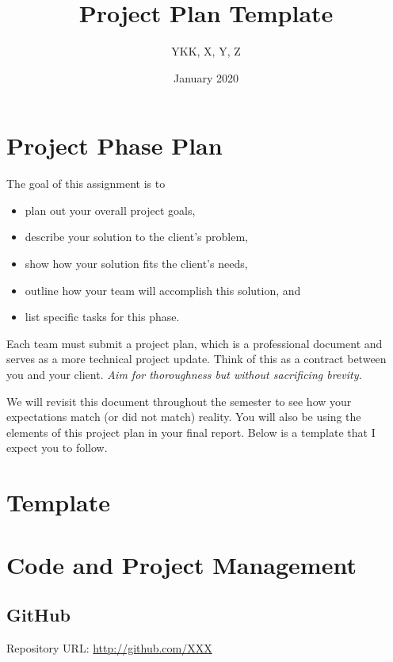 \documentclass{article}
\title{Project Plan Template}
\author{YKK, X, Y, Z}
\date{January 2020}
\begin{document}
\maketitle



\section*{Project Phase Plan} %
%

The goal of this assignment is to 
\begin{itemize}
\item plan out your overall project goals, 
\item describe your solution to the client's problem,
\item show how your solution fits the client's needs, 
\item outline how your team will accomplish this solution, and 
\item list specific tasks for this phase.
\end{itemize}

Each team must submit a project plan, which is a professional document and serves as a more technical project update.
Think of this as a contract between you and your client. 
\textit{Aim for thoroughness but without sacrificing brevity. }

We will revisit this document throughout the semester to see how your expectations match (or did not match) reality. 
You will also be using the elements of this project plan in your final report. 
Below is a template that I expect you to follow.

\newpage

\section*{Template}  %

\section*{Code and Project Management}

\subsection*{GitHub}
Repository URL: 
\url{http://github.com/XXX}
\end{document}
